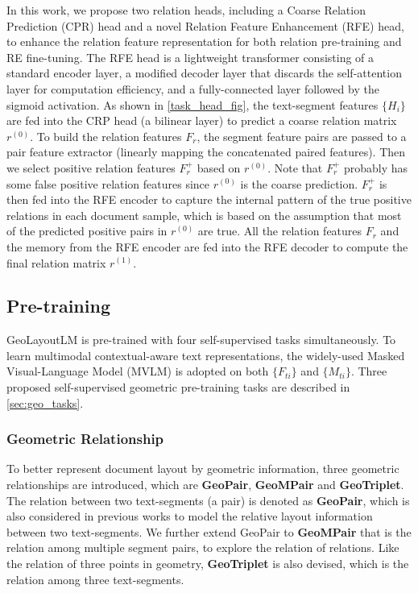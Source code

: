 \documentclass[10pt,twocolumn,letterpaper]{article}
\begin{document}
In this work, we propose two relation heads, including a Coarse Relation Prediction (CPR) head and a novel Relation Feature Enhancement (RFE) head, to enhance the relation feature representation for both relation pre-training and RE fine-tuning.
The RFE head is a lightweight transformer\cite{vaswani2017attention} consisting of a standard encoder layer, a modified decoder layer that discards the self-attention layer for computation efficiency, and a fully-connected layer followed by the sigmoid activation.
As shown in \cref{task_head_fig}, the text-segment features $\{H_i\}$ are fed into the CRP head (a bilinear layer) to predict a coarse relation matrix $r^{(0)}$.
To build the relation features $F_r$, the segment feature pairs are passed to a pair feature extractor (linearly mapping the concatenated paired features).
Then we select positive relation features $F_r^+$ based on $r^{(0)}$.
Note that $F_r^+$ probably has some false positive relation features since $r^{(0)}$ is the coarse prediction.
$F_r^+$ is then fed into the RFE encoder to capture the internal pattern of the true positive relations in each document sample, which is based on the assumption that most of the predicted positive pairs in $r^{(0)}$ are true.
All the relation features $F_r$ and the memory from the RFE encoder are fed into the RFE decoder to compute the final relation matrix $r^{(1)}$.




\subsection{Pre-training}





GeoLayoutLM is pre-trained with four self-supervised tasks simultaneously.
To learn multimodal contextual-aware text representations, the widely-used Masked Visual-Language Model (MVLM)\cite{xu2020layoutlm,xu2020layoutlmv2,huang2022layoutlmv3} is adopted on both $\{F_{ti}\}$ and $\{M_{ti}\}$.
Three proposed self-supervised geometric pre-training tasks are described in \cref{sec:geo_tasks}.











\subsubsection{Geometric Relationship}
To better represent document layout by geometric information, three geometric relationships are introduced, which are \textbf{GeoPair}, \textbf{GeoMPair} and \textbf{GeoTriplet}.
The relation between two text-segments (a pair) is denoted as \textbf{GeoPair}, which is also considered in previous works\cite{liu2019graph,luo2020merge,li2021structext} to model the relative layout information between two text-segments.
We further extend GeoPair to \textbf{GeoMPair} that is the relation among multiple segment pairs, to explore the relation of relations.
Like the relation of three points in geometry, \textbf{GeoTriplet} is also devised, which is the relation among three text-segments.
\end{document}
